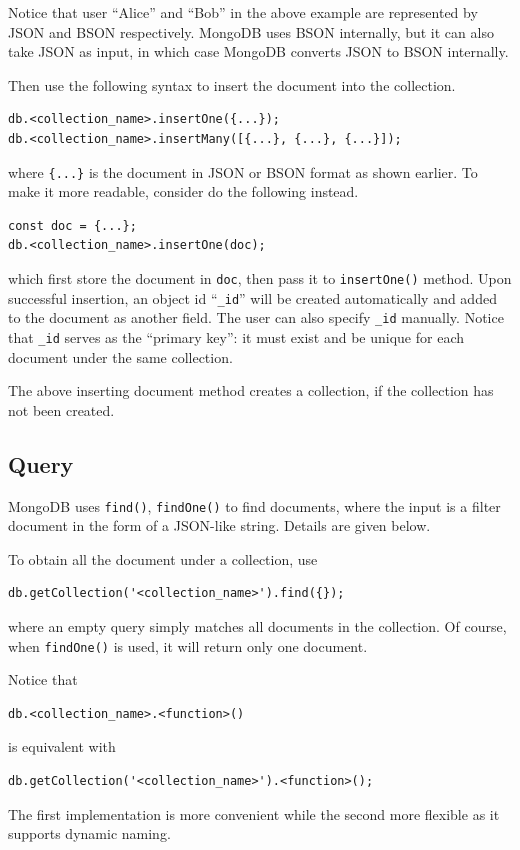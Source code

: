 Notice that user ``Alice'' and ``Bob'' in the above example are represented by JSON and BSON respectively. MongoDB uses BSON internally, but it can also take JSON as input, in which case MongoDB converts JSON to BSON internally.

Then use the following syntax to insert the document into the collection.
\begin{lstlisting}
db.<collection_name>.insertOne({...});
db.<collection_name>.insertMany([{...}, {...}, {...}]);
\end{lstlisting}
where \verb|{...}| is the document in JSON or BSON format as shown earlier. To make it more readable, consider do the following instead.
\begin{lstlisting}
const doc = {...};
db.<collection_name>.insertOne(doc);
\end{lstlisting}
which first store the document in \verb|doc|, then pass it to \verb|insertOne()| method. Upon successful insertion, an object id ``\verb|_id|'' will be created automatically and added to the document as another field. The user can also specify \verb|_id| manually. Notice that \verb|_id| serves as the ``primary key'': it must exist and be unique for each document under the same collection.

The above inserting document method creates a collection, if the collection has not been created.

\subsection{Query}

MongoDB uses \verb|find()|, \verb|findOne()| to find documents, where the input is a filter document in the form of a JSON-like string. Details are given below.

To obtain all the document under a collection, use
\begin{lstlisting}
db.getCollection('<collection_name>').find({});
\end{lstlisting}
where an empty query simply matches all documents in the collection. Of course, when \verb|findOne()| is used, it will return only one document.

\begin{shortbox}
Notice that
\begin{lstlisting}
db.<collection_name>.<function>()
\end{lstlisting}
is equivalent with
\begin{lstlisting}
db.getCollection('<collection_name>').<function>();
\end{lstlisting}
The first implementation is more convenient while the second more flexible as it supports dynamic naming.
\end{shortbox}

